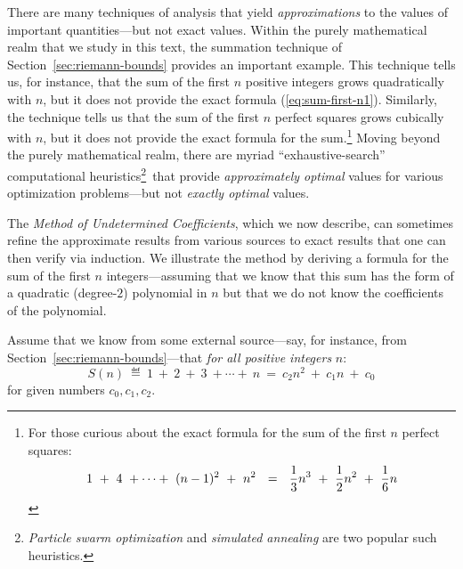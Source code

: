 There are many techniques of analysis that yield {\em approximations}
to the values of important quantities---but not exact values.  Within
the purely mathematical realm that we study in this text, the
summation technique of Section~\ref{sec:riemann-bounds} provides an
important example.  This technique tells us, for instance, that the
sum of the first $n$ positive integers grows quadratically with $n$,
but it does not provide the exact formula (\ref{eq:sum-first-n1}).
Similarly, the technique tells us that the sum of the first $n$
perfect squares grows cubically with $n$, but it does not provide the
exact formula for the sum.\footnote{For those curious about the exact
  formula for the sum of the first $n$ perfect squares:
\begin{equation}
\label{eq:sum-1-to-nsq1}
1 \ + \ 4 \ + \cdots + \ (n-1)^2 \ + \ n^2 
 \ \ = \ \
{1 \over 3} n^3 \ + \ {1 \over 2} n^2 \ + \ {1 \over 6} n
\end{equation}}
Moving beyond the purely mathematical realm, there are myriad
``exhaustive-search'' computational heuristics\footnote{{\it Particle
    swarm optimization} \cite{KennedyE95} and {\it simulated
    annealing} \cite{KirkpatrickGV83} are two popular such
  heuristics.}~that provide {\em approximately optimal} values for various
optimization problems---but not {\em exactly optimal} values.

\medskip

The {\em Method of Undetermined Coefficients}, which we now describe,
can sometimes refine the approximate results from various sources to
exact results that one can then verify via induction.  We illustrate
the method by deriving a formula for the sum of the first $n$
integers---assuming that we know that this sum has the form of a
quadratic (degree-$2$) polynomial in $n$ but that we do not know the
coefficients of the polynomial.

Assume that we know from some external source---say, for instance,
from Section~\ref{sec:riemann-bounds}---that {\em for all positive
  integers} $n$:
\begin{equation}
\label{eq:formula-for-n}
S(n) \ \eqdef \
 1 \ + \ 2 \ + \ 3 \ + \cdots + \ n 
 \ = \ 
c_2 n^2 \ + \ c_1 n \ + \ c_0
\end{equation}
for given numbers $c_0, c_1, c_2$.

